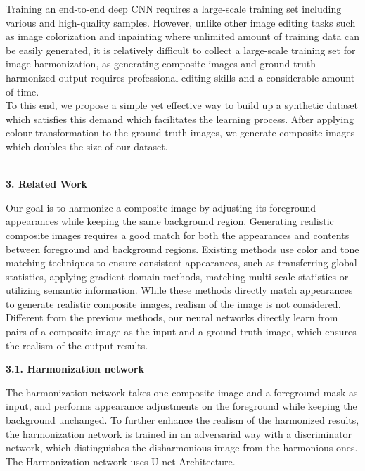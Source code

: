 \documentclass{article}
\begin{document}
Training an end-to-end deep CNN requires a large-scale training set including various and high-quality samples. However, unlike other image editing tasks such as image colorization and inpainting where unlimited amount of training data can be easily generated, it is relatively difficult to collect a large-scale training set for image harmonization, as generating composite images and ground truth harmonized output requires professional editing skills and a considerable amount of time.\\

To this end, we propose a simple yet effective way to build up a synthetic dataset which satisfies this demand which facilitates the learning process. After applying colour transformation to the ground truth images, we generate composite images which doubles the size of our dataset.\\\\

\begin{flushleft}
\textbf{\large 3. Related Work}
\end{flushleft}

Our goal is to harmonize a composite image by adjusting its foreground appearances while keeping the same background region. 
Generating realistic composite images requires a good match for both the appearances and contents between foreground and background regions. Existing methods use color and tone matching techniques to ensure consistent appearances, such as transferring global statistics, applying gradient domain methods, matching multi-scale statistics or utilizing semantic information. While these methods directly match appearances to generate realistic composite images, realism of the image is not considered. Different from the previous methods, our neural networks directly learn from pairs of a composite image as the input and a ground truth image, which ensures the realism of the output results.\\

\begin{flushleft}
\textbf{3.1. Harmonization network}
\end{flushleft}

The harmonization network takes one composite image and a foreground mask as input, and performs appearance adjustments on the foreground while keeping the background unchanged. To further enhance the realism of the harmonized results, the harmonization network is trained in an adversarial way with a discriminator network, which distinguishes the disharmonious image from the harmonious ones. The Harmonization network uses U-net Architecture.\\
\end{document}
